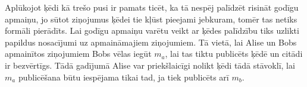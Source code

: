 Aplūkojot ķēdi kā trešo pusi ir pamats ticēt, ka tā nespēj palīdzēt risināt godīgu apmaiņu, jo sūtot ziņojumus ķēdei tie kļūst pieejami jebkuram, tomēr tas netiks formāli pierādīts. Lai godīgu apmaiņu varētu veikt ar ķēdes palīdzību tiks uzlikti papildus nosacījumi uz apmaināmajiem ziņojumiem. Tā vietā, lai Alise un Bobs apmainītos ziņojumiem Bobs vēlas iegūt $m_a$, lai tas tiktu publicēts ķēdē un citādi ir bezvērtīgs. Tādā gadījumā Alise var priekšlaicīgi nolikt ķēdi tādā stāvoklī, lai $m_a$ publicēšana būtu iespējama tikai tad, ja tiek publicēts arī $m_b$.

